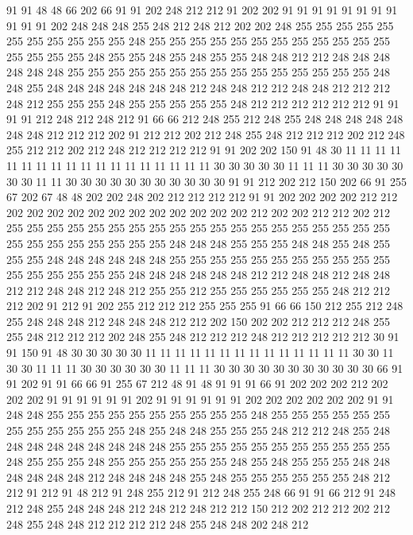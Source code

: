 91 91 48 48 66 202 66 91 91 202 248 212 212 91 202 202 91 91 91 91
91 91 91 91 91 91 91 202 248 248 248 255 248 212 248 212 202 202 248 255
255 255 255 255 255 255 255 255 255 255 248 255 255 255 255 255 255 255 255 255
255 255 255 255 255 255 255 248 255 255 248 255 248 255 255 248 248 212 212 248
248 248 248 248 248 255 255 255 255 255 255 255 255 255 255 255 255 255 255 255
248 248 255 248 248 248 248 248 248 248 212 248 248 212 212 248 248 212 212 212
248 212 255 255 255 248 255 255 255 255 255 248 212 212 212 212 212 212 91 91
91 91 212 248 212 248 212 91 66 66 212 248 255 212 248 255 248 248 248 248
248 248 248 212 212 212 202 91 212 212 202 212 248 255 248 212 212 212 202 212
248 255 212 212 202 212 248 212 212 212 212 91 91 202 202 150 91 48 30 11
11 11 11 11 11 11 11 11 11 11 11 11 11 11 11 11 11 30 30 30
30 30 11 11 11 30 30 30 30 30 30 30 11 11 30 30 30 30 30 30
30 30 30 30 30 91 91 212 202 212 150 202 66 91 255 67 202 67 48 48
202 202 248 202 212 212 212 212 91 91 202 202 202 202 212 212 202 202 202 202
202 202 202 202 202 202 202 202 212 202 202 212 212 202 212 255 255 255 255 255
255 255 255 255 255 255 255 255 255 255 255 255 255 255 255 255 255 255 255 255
255 255 248 248 248 255 255 255 248 248 255 248 255 255 255 248 248 248 248 248
248 255 255 255 255 255 255 255 255 255 255 255 255 255 255 255 255 255 248 248
248 248 248 248 212 212 248 248 212 248 248 212 212 248 248 212 248 212 255 255
212 255 255 255 255 255 255 248 212 212 212 202 91 212 91 202 255 212 212 212
255 255 255 91 66 66 150 212 255 212 248 255 248 248 248 212 248 248 248 212
212 202 150 202 202 212 212 212 248 255 255 248 212 212 212 202 248 255 248 212
212 212 248 212 212 212 212 212 30 91 91 150 91 48 30 30 30 30 30 11
11 11 11 11 11 11 11 11 11 11 11 11 11 30 30 11 30 30 11 11
11 30 30 30 30 30 30 11 11 11 30 30 30 30 30 30 30 30 30 30
30 66 91 91 202 91 91 66 66 91 255 67 212 48 91 48 91 91 91 66
91 202 202 202 212 202 202 202 91 91 91 91 91 91 202 91 91 91 91 91
91 202 202 202 202 202 202 91 91 248 248 255 255 255 255 255 255 255 255 255
255 248 255 255 255 255 255 255 255 255 255 255 255 255 248 255 248 248 255 255
255 248 212 212 248 255 248 248 248 248 248 248 248 248 248 255 255 255 255 255
255 255 255 255 255 255 248 255 255 255 248 255 255 255 255 255 255 248 255 248
255 255 255 248 248 248 248 248 248 212 248 248 248 248 255 248 255 255 255 255
255 255 248 212 212 91 212 91 48 212 91 248 255 212 91 212 248 255 248 66
91 91 66 212 91 248 212 248 255 248 248 248 212 248 212 248 212 212 150 212
202 212 212 202 212 248 255 248 248 212 212 212 212 248 255 248 248 202 248 212

